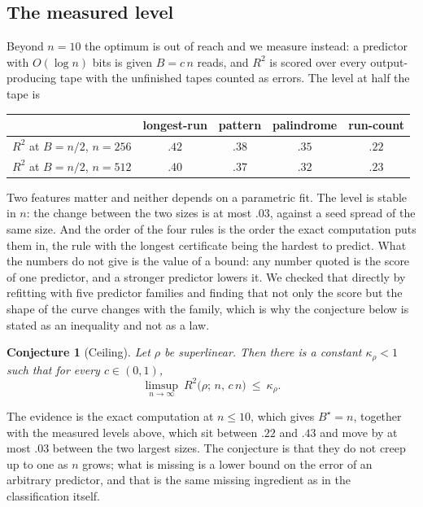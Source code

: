 \documentclass[11pt]{article}
\newtheorem{conjecture}{Conjecture}
\begin{document}
\subsection{The measured level}

Beyond $n=10$ the optimum is out of reach and we measure instead: a predictor with $O(\log n)$
bits is given $B=c\,n$ reads, and $R^2$ is scored over every output-producing tape with the
unfinished tapes counted as errors. The level at half the tape is

\begin{center}
\begin{tabular}{lcccc}
\toprule
& longest-run & pattern & palindrome & run-count \\
\midrule
$R^2$ at $B=n/2$, $n=256$ & $.42$ & $.38$ & $.35$ & $.22$ \\
$R^2$ at $B=n/2$, $n=512$ & $.40$ & $.37$ & $.32$ & $.23$ \\
\bottomrule
\end{tabular}
\end{center}

Two features matter and neither depends on a parametric fit. The level is stable in $n$: the
change between the two sizes is at most $.03$, against a seed spread of the same size. And
the order of the four rules is the order the exact computation puts them in, the rule with
the longest certificate being the hardest to predict. What the numbers do not give is the
value of a bound: any number quoted is the score of one predictor, and a stronger predictor
lowers it. We checked that directly by refitting with five predictor families and finding
that not only the score but the shape of the curve changes with the family, which is why the
conjecture below is stated as an inequality and not as a law.

\begin{conjecture}[Ceiling]\label{conj:ceiling2}
Let $\rho$ be superlinear. Then there is a
constant $\kappa_\rho<1$ such that for every $c\in(0,1)$,
\[
\limsup_{n\to\infty}\ R^2\big(\rho;\,n,\,c\,n\big)\ \le\ \kappa_\rho .
\]
\end{conjecture}

The evidence is the exact computation at $n\le10$, which gives $B^\star=n$, together with
the measured levels above, which sit between $.22$ and $.43$ and move by at most $.03$
between the two largest sizes. The conjecture is that they do not creep up to one as $n$
grows; what is missing is a lower bound on the error of an arbitrary predictor, and that is
the same missing ingredient as in the classification itself.
\end{document}
